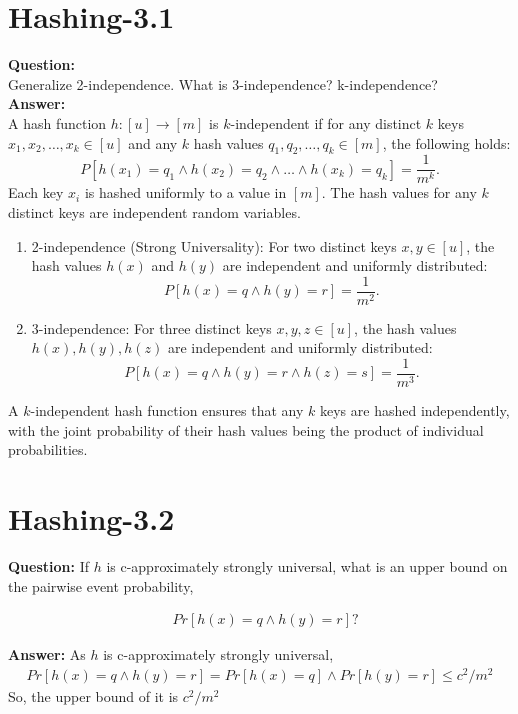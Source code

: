 \documentclass[12pt]{article}
\begin{document}

\section{Hashing-3.1}
\textbf{Question:}\\
Generalize 2-independence. What is 3-independence? k-independence?\\
\textbf{Answer:}\\
A hash function \( h : [u] \to [m] \) is \( k \)-independent if for any distinct \( k \) keys \( x_1, x_2, \dots, x_k \in [u] \) and any \( k \) hash values \( q_1, q_2, \dots, q_k \in [m] \), the following holds:
\[
P[h(x_1) = q_1 \land h(x_2) = q_2 \land \dots \land h(x_k) = q_k] = \frac{1}{m^k}.
\]
Each key \( x_i \) is hashed uniformly to a value in \( [m] \). The hash values for any \( k \) distinct keys are independent random variables.
\begin{enumerate}
    \item 2-independence (Strong Universality): For two distinct keys \( x, y \in [u] \), the hash values \( h(x) \) and \( h(y) \) are independent and uniformly distributed:
    \[
    P[h(x) = q \land h(y) = r] = \frac{1}{m^2}.
    \]
    \item 3-independence: For three distinct keys \( x, y, z \in [u] \), the hash values \( h(x), h(y), h(z) \) are independent and uniformly distributed:
    \[
    P[h(x) = q \land h(y) = r \land h(z) = s] = \frac{1}{m^3}.
    \]
\end{enumerate}
A \( k \)-independent hash function ensures that any \( k \) keys are hashed independently, with the joint probability of their hash values being the product of individual probabilities.

\section{Hashing-3.2}
\textbf{Question: }
If $h$ is c-approximately strongly universal, what is an upper bound on the pairwise event probability,

\begin{align}
&Pr[h(x) = q \wedge h(y) = r]?
\end{align}

\textbf{Answer:}
As $h$ is c-approximately strongly universal, 
\begin{align}
    Pr[h(x) = q \wedge h(y) = r] = Pr[h(x) = q] \wedge Pr[h(y) = r]\leq c^2/m^2
\end{align}
So, the upper bound of it is $c^2/m^2$
\end{document}

